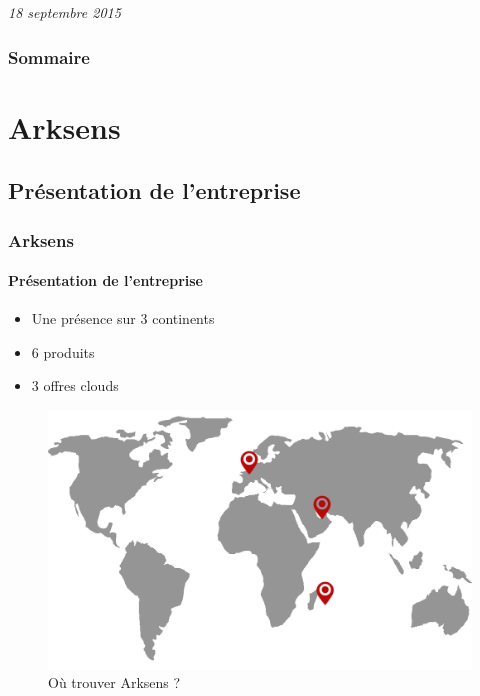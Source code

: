 \documentclass{beamer}
\begin{document}
\begin{frame}
  \begin{center}
    \emph{18 septembre 2015}
  \end{center}
    
\end{frame}

\begin{frame}
 \frametitle{Sommaire}
 \tableofcontents
\end{frame}

\section{Arksens}
\subsection{Présentation de l'entreprise}
\begin{frame}
 \frametitle{Arksens}
 \framesubtitle{Présentation de l'entreprise}
 \begin{minipage}{0.49\textwidth}
  \begin{itemize}
    \item Une présence sur 3 continents
    \item 6 produits
    \item 3 offres clouds
  \end{itemize}
 \end{minipage}
 \begin{minipage}{0.49\textwidth}
  \begin{figure}[h!]
    \centering
    \includegraphics[scale=0.13]{map_arksens.png}
    \caption{Où trouver Arksens ?}
  \end{figure}
 \end{minipage}
\end{frame}
\end{document}
